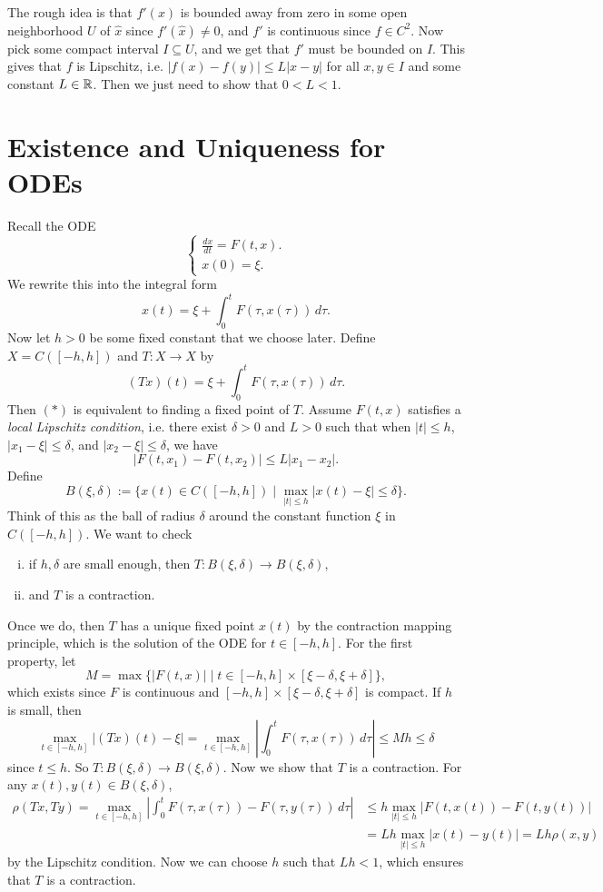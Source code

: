 \begin{remark}
  The rough idea is that $f'(x)$ is bounded away from
  zero in some open neighborhood $U$ of $\hat{x}$ since
  $f'(\hat{x}) \ne 0$, and $f'$ is continuous since
  $f \in C^2$. Now pick some compact interval
  $I \subseteq U$, and we get that $f'$ must
  be bounded on $I$. This gives that $f$ is
  Lipschitz, i.e. $|f(x) - f(y)| \le L|x - y|$ for
  all $x, y \in I$ and some constant $L \in \mathbb{R}$. Then
  we just need to show that $0 < L < 1$.
\end{remark}

\section{Existence and Uniqueness for ODEs}
Recall the ODE
\[
  \begin{cases}
    \frac{dx}{dt} = F(t, x). \\
    x(0) = \xi.
  \end{cases}
\]
We rewrite this into the integral form
\[
  x(t) = \xi + \int_0^t F(\tau, x(\tau)) \, d\tau. \tag{$*$}
\]
Now let $h > 0$ be some fixed constant that we
choose later. Define $X = C([-h, h])$ and $T : X \to X$ by
\[
  (Tx)(t) = \xi + \int_0^t F(\tau, x(\tau)) \, d\tau.
\]
Then $(*)$ is equivalent to finding a fixed point of $T$.
Assume $F(t, x)$ satisfies a \emph{local Lipschitz condition}, i.e.
there exist $\delta > 0$ and $L > 0$ such that when
$|t| \le h$, $|x_1 - \xi| \le \delta$, and
$|x_2 - \xi| \le \delta$, we have
\[
  |F(t, x_1) - F(t, x_2)| \le L|x_1 - x_2|.
\]
Define
\[
  B(\xi, \delta) := \{
    x(t) \in C([-h, h]) \mid \max_{|t| \le h} |x(t) - \xi| \le \delta
  \}.
\]
Think of this as the ball of radius $\delta$ around the
constant function $\xi$ in $C([-h, h])$. We want to check
\begin{enumerate}[(i)]
  \item if $h, \delta$ are small enough, then
    $T : B(\xi, \delta) \to B(\xi, \delta)$,
  \item and $T$ is a contraction.
\end{enumerate}
Once we do, then $T$ has a unique fixed point
$\hat{x}(t)$ by the contraction mapping principle,
which is the solution of the ODE for $t \in [-h, h]$.
For the first property, let
\[
  M = \max\{|F(t, x)| \mid t \in [-h, h] \times [\xi - \delta, \xi + \delta]\},
\]
which exists since $F$ is continuous and $[-h, h] \times [\xi - \delta, \xi + \delta]$ is compact.
If $h$ is small, then
\[
  \max_{t \in [-h, h]} |(Tx)(t) - \xi|
  = \max_{t \in [-h, h]} \left| \int_0^t F(\tau, x(\tau)) \, d\tau \right|
  \le Mh \le \delta
\]
since $t \le h$. So
$T : B(\xi, \delta) \to B(\xi, \delta)$. Now we show that
$T$ is a contraction. For any
$x(t), y(t) \in B(\xi, \delta)$,
\begin{align*}
  \rho(Tx, Ty)
  = \max_{t \in [-h, h]} \left| \int_0^t F(\tau, x(\tau)) - F(\tau, y(\tau)) \, d\tau \right|
  &\le h \max_{|t| \le h} |F(t, x(t)) - F(t, y(t))| \\
  &= L h \max_{|t| \le h} |x(t) - y(t)|
  = Lh \rho(x, y)
\end{align*}
by the Lipschitz condition. Now we can choose $h$ such
that
$Lh < 1$, which ensures that $T$ is a contraction.

